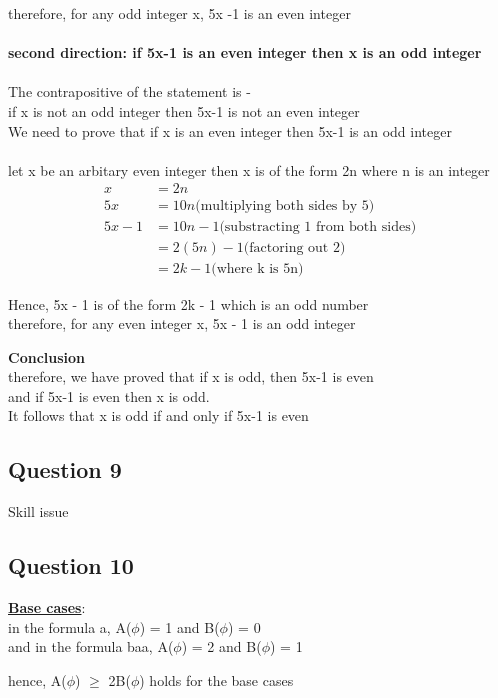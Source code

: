 \documentclass[11pt]{article}
\begin{document}
{{{therefore, for any odd integer x, 5x -1 is an even integer
\\ \\
\textbf{second direction: if 5x-1 is an even integer then x is an odd integer} \\
\\
The contrapositive of the statement is - \\
if x is not an odd integer then 5x-1 is not an even integer \\
We need to prove that
if x is an even integer then 5x-1 is an odd integer \\
\\
let x be an arbitary even integer then x is of the form 2n
where n is an integer \\
\begin{align*}
    x &= 2n \\
    5x &= 10n \text{(multiplying both sides by 5)} \\
    5x - 1 &= 10n - 1 \text{(substracting 1 from both sides)}  \\
    &= 2(5n)  - 1 \text{(factoring out 2)} \\
    &= 2k - 1 \text{(where k is 5n)}
\end{align*}

Hence, 5x - 1 is of the form 2k - 1 which is an odd number \\
therefore, for any even integer x, 5x - 1 is an odd integer

\noindent
\textbf{Conclusion} \\
therefore, we have proved that if x is odd, then 5x-1 is even \\
and if 5x-1 is even then x is odd. \\
It follows that x is odd if and only if 5x-1 is even

\subsection*{Question 9}
Skill issue

\subsection*{Question 10}
\underline{\textbf{Base cases}}: \\
in the formula a,
A($\phi$) = 1 and B($\phi$) = 0 \\
and in the formula baa,
A($\phi$) = 2 and B($\phi$) = 1

hence, A($\phi$) $\geq$ 2B($\phi$) holds for the base cases

}}}
\end{document}
